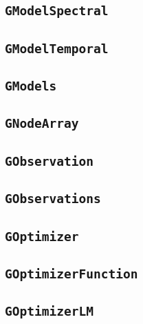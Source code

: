 \documentclass{article}[12pt,a4]
\begin{document}
\subsection{{\tt GModelSpectral}}

\subsection{{\tt GModelTemporal}}

\subsection{{\tt GModels}}

\subsection{{\tt GNodeArray}}

\subsection{{\tt GObservation}}

\subsection{{\tt GObservations}}

\subsection{{\tt GOptimizer}}

\subsection{{\tt GOptimizerFunction}}

\subsection{{\tt GOptimizerLM}}

\end{document}
